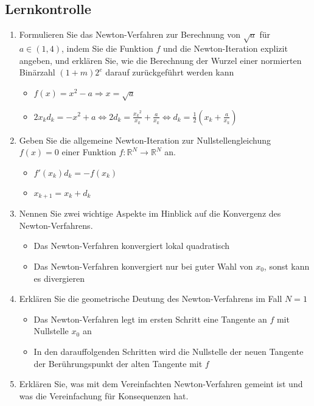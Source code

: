 \documentclass[]{article}
\begin{document}
\subsection{Lernkontrolle}
	\begin{enumerate}
		\item Formulieren Sie das Newton-Verfahren zur Berechnung von $\sqrt{a}$ für $a  \in (1,4)$, indem Sie die Funktion $f$ und die Newton-Iteration explizit angeben, und erklären Sie, wie die Berechnung der Wurzel einer normierten Binärzahl $(1+m)2^e$ darauf zurückgeführt werden kann
			\begin{itemize}
				\item $f(x) = x^2 - a \Rightarrow x = \sqrt{a}$
				\item $2x_kd_k = -x^2 + a \Leftrightarrow 2 d_k = \frac{{x_k}^2}{x_k}+\frac{a}{x_k} \Leftrightarrow d_k = \frac{1}{2}({x_k} + \frac{a}{x_k})$
			\end{itemize}
		\item Geben Sie die allgemeine Newton-Iteration zur Nullstellengleichung $f(x)=0$ einer Funktion $f: \mathbb{R}^N \rightarrow \mathbb{R}^N$ an.
			\begin{itemize}
				\item $f'(x_k)d_k = -f(x_k)$
				\item $x_{k+1} = x_k + d_k$
			\end{itemize}
		\item Nennen Sie zwei wichtige Aspekte im Hinblick auf die Konvergenz des Newton-Verfahrens.
			\begin{itemize}
				\item Das Newton-Verfahren konvergiert lokal quadratisch
				\item Das Newton-Verfahren konvergiert nur bei guter Wahl von $x_0$, sonst kann es divergieren
			\end{itemize}	
		\item Erklären Sie die geometrische Deutung des Newton-Verfahrens im Fall $N=1$
			\begin{itemize}
				\item Das Newton-Verfahren legt im ersten Schritt eine Tangente an $f$ mit Nullstelle $x_0$ an
				\item In den darauffolgenden Schritten wird die Nullstelle der neuen Tangente der Berührungspunkt der alten Tangente mit $f$ 
			\end{itemize}
		\item Erklären Sie, was mit dem Vereinfachten Newton-Verfahren gemeint ist und was die Vereinfachung für Konsequenzen hat.

\end{enumerate}
\end{document}
